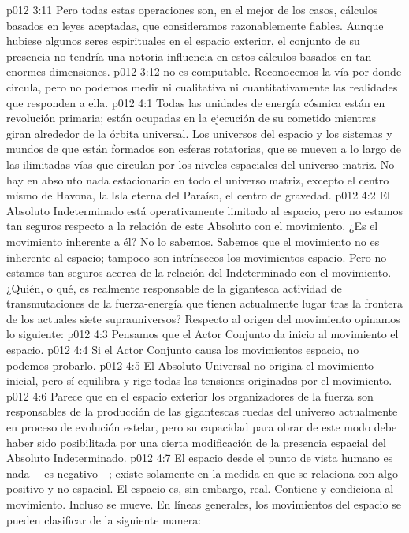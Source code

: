 \vs p012 3:11 Pero todas estas operaciones son, en el mejor de los casos, cálculos basados en leyes aceptadas, que consideramos razonablemente fiables. Aunque hubiese algunos seres espirituales en el espacio exterior, el conjunto de su presencia no tendría una notoria influencia en estos cálculos basados en tan enormes dimensiones.
\vs p012 3:12 \pc {} no es computable. Reconocemos la vía por donde circula, pero no podemos medir ni cualitativa ni cuantitativamente las realidades que responden a ella.
\vs p012 4:1 Todas las unidades de energía cósmica están en revolución primaria; están ocupadas en la ejecución de su cometido mientras giran alrededor de la órbita universal. Los universos del espacio y los sistemas y mundos de que están formados son esferas rotatorias, que se mueven a lo largo de las ilimitadas vías que circulan por los niveles espaciales del universo matriz. No hay en absoluto nada estacionario en todo el universo matriz, excepto el centro mismo de Havona, la Isla eterna del Paraíso, el centro de gravedad.
\vs p012 4:2 El Absoluto Indeterminado está operativamente limitado al espacio, pero no estamos tan seguros respecto a la relación de este Absoluto con el movimiento. ¿Es el movimiento inherente a él? No lo sabemos. Sabemos que el movimiento no es inherente al espacio; tampoco son intrínsecos los movimientos  espacio. Pero no estamos tan seguros acerca de la relación del Indeterminado con el movimiento. ¿Quién, o qué, es realmente responsable de la gigantesca actividad de transmutaciones de la fuerza\hyp{}energía que tienen actualmente lugar tras la frontera de los actuales siete suprauniversos? Respecto al origen del movimiento opinamos lo siguiente:
\vs p012 4:3 Pensamos que el Actor Conjunto da inicio al movimiento  el espacio.
\vs p012 4:4 Si el Actor Conjunto causa los movimientos  espacio, no podemos probarlo.
\vs p012 4:5 El Absoluto Universal no origina el movimiento inicial, pero sí equilibra y rige todas las tensiones originadas por el movimiento.
\vs p012 4:6 \pc Parece que en el espacio exterior los organizadores de la fuerza son responsables de la producción de las gigantescas ruedas del universo actualmente en proceso de evolución estelar, pero su capacidad para obrar de este modo debe haber sido posibilitada por una cierta modificación de la presencia espacial del Absoluto Indeterminado.
\vs p012 4:7 \pc El espacio desde el punto de vista humano es nada ---es negativo---; existe solamente en la medida en que se relaciona con algo positivo y no espacial. El espacio es, sin embargo, real. Contiene y condiciona al movimiento. Incluso se mueve. En líneas generales, los movimientos del espacio se pueden clasificar de la siguiente manera:
